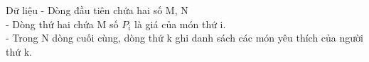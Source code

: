 Dữ liệu  
- Dòng đầu tiên chứa hai số M, N   
\\   - Dòng thứ hai chứa M số $P_{i}$   là giá của món thứ i.   
\\   - Trong N dòng cuối cùng, dòng thứ k ghi danh sách các món yêu thích của người thứ k.